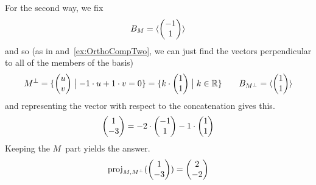 \begin{exercises}
\begin{answer}
\begin{exparts}
           For the second way, we fix
           \begin{equation*}
             B_M=\sequence{\colvec{-1 \\ 1}}
           \end{equation*}
           and so
           (as in  and~\ref{ex:OrthoCompTwo}, 
           we can just find the vectors perpendicular to all of the members 
           of the basis)
           \begin{equation*}
             M^\perp
             =\set{\colvec{u \\ v}\suchthat -1\cdot u+1\cdot v=0}
             =\set{k\cdot\colvec{1 \\ 1}\suchthat k\in\Re}
             \qquad
             B_{M^\perp}=\sequence{\colvec{1 \\ 1}}
           \end{equation*}
           and representing the vector with respect to the concatenation
           gives this.
           \begin{equation*}
             \colvec{1 \\ -3}=-2\cdot\colvec{-1 \\ 1}-1\cdot\colvec{1 \\ 1}
           \end{equation*}
           Keeping the $M$~part yields the answer.
           \begin{equation*}
             \proj{\colvec{1 \\ -3}}{M,M^\perp}=\colvec{2 \\ -2}
           \end{equation*}


\end{exparts}
\end{answer}
\end{exercises}
